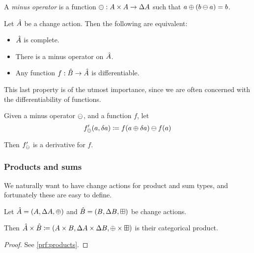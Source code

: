 \begin{defn}
  A \emph{minus operator} is a function $\ominus: A \times A \rightarrow \Delta A$ such that $a \oplus (b \ominus a) = b$.
\end{defn}

\begin{prop}
  Let $\hat{A}$ be a change action. Then the following are equivalent:
  \begin{itemize}
    \item $\hat{A}$ is complete.
    \item There is a minus operator on $\hat{A}$.
    \item Any function $f: \hat{B} \rightarrow \hat{A}$ is differentiable.
  \end{itemize}
\end{prop}

This last property is of the utmost importance, since we are often concerned with the differentiability
of functions.

\begin{prop}
  \label{prop:minusDerivatives}
  Given a minus operator $\ominus$, and a function $f$, let
  \begin{displaymath}
    f'_\ominus(a, \delta a) \coloneqq f(a \oplus \delta a) \ominus f(a)
  \end{displaymath}

  Then $f'_\ominus$ is a derivative for $f$.
\end{prop}

\subsubsection{Products and sums}

We naturally want to have change actions for product and sum types, and
fortunately these are easy to define.

\begin{prop}[name=Products, restate=products]
  \label{prop:products}
  Let $\hat{A} = (A,\Delta A,\oplus)$ and $\hat{B} =
  (B,\Delta B,\boxplus)$ be change actions.

  Then $\hat{A} \times \hat{B} \coloneqq (A \times B,\Delta A \times
  \Delta B,\oplus \times \boxplus)$ is their categorical product.
\end{prop}
\ifproofs
\begin{proof}
  See \cref{prf:products}.
\end{proof}
\fi

